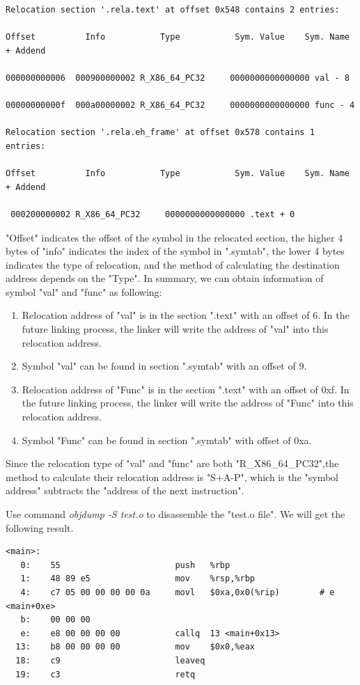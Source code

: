         \begin{lstlisting}[caption=Relocation section of "test.o"]
Relocation section '.rela.text' at offset 0x548 contains 2 entries: 

Offset          Info           Type           Sym. Value    Sym. Name + Addend 

000000000006  000900000002 R_X86_64_PC32     0000000000000000 val - 8 

00000000000f  000a00000002 R_X86_64_PC32     0000000000000000 func - 4 

Relocation section '.rela.eh_frame' at offset 0x578 contains 1 entries: 

Offset          Info           Type           Sym. Value    Sym. Name + Addend 

 000200000002 R_X86_64_PC32     0000000000000000 .text + 0            \end{lstlisting}
            
         
    "Offset" indicates the offset of the symbol in the relocated section, the higher 4 bytes of "info" indicates the index of the symbol in ".symtab", the lower 4 bytes indicates the type of relocation, and the method of calculating the destination address depends on the "Type".
    In summary, we can obtain information of symbol "val" and "func" as following:
    \begin{enumerate}
        \item Relocation address of "val" is in the section ".text" with an offset of 6. In the future linking process, the linker will write the address of "val" into this relocation address.
        \item Symbol "val" can be found in section ".symtab" with an offset of 9.
        \item  Relocation address of "Func" is in the section ".text" with an offset of 0xf. In the future linking process, the linker will write the address of "Func" into this relocation address.
        \item Symbol "Func" can be found in section ".symtab" with offset of 0xa.
    \end{enumerate}
   
     Since the relocation type of "val" and "func" are both "R\_X86\_64\_PC32",the method to calculate their relocation address is "S+A-P", which is the "symbol address" subtracts the "address of the next instruction"\cite{TIS-95}.\newline
     
     Use command \textit{objdump -S test.o} to disassemble the "test.o file". We will get the following result.
     \begin{lstlisting}[caption=Disassembly of section .text: ]
<main>: 
   0:    55                       push   %rbp 
   1:    48 89 e5                 mov    %rsp,%rbp 
   4:    c7 05 00 00 00 00 0a     movl   $0xa,0x0(%rip)        # e <main+0xe> 
   b:    00 00 00 
   e:    e8 00 00 00 00           callq  13 <main+0x13> 
  13:    b8 00 00 00 00           mov    $0x0,%eax 
  18:    c9                       leaveq 
  19:    c3                       retq
     \end{lstlisting}
     
